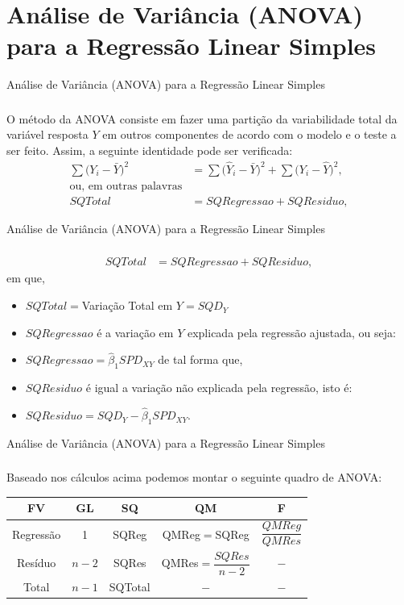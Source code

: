 \documentclass[14pt,aspectratio=1610]{beamer}
\begin{document}
\section{Análise de Variância (ANOVA) para a Regressão Linear Simples}
\begin{frame}{Análise de Variância (ANOVA) para a Regressão Linear Simples}
\frametitle{}
\begin{block}{}
\justifying
O método da ANOVA consiste em fazer uma partição da variabilidade total da variável resposta $Y$ em outros componentes de acordo com o modelo e o teste a ser feito. Assim, a seguinte identidade pode ser verificada:
\begin{align*}
    \sum\big(Y_{i}-\bar{Y}\big)^{2}&=\sum\big(\hat{Y}_{i}-\bar{Y}\big)^{2}+\sum\big(Y_{i}-\hat{Y}\big)^{2},\\
    \textrm{ou, em outras palavras}\\
    SQTotal&=SQRegressao+SQResiduo,
\end{align*}
\end{block}
\end{frame}

\begin{frame}{Análise de Variância (ANOVA) para a Regressão Linear Simples}
\frametitle{}
\begin{block}{}
\justifying
\begin{align*}
    SQTotal&=SQRegressao+SQResiduo,
\end{align*}
em que, 
\begin{itemize}
    \item $SQTotal=$Variação Total em $Y=SQD_{Y}$\pause 
    \item $SQRegressao$ é a variação em $Y$ explicada pela regressão ajustada, ou seja:\pause
    \item $SQRegressao=\hat{\beta}_{1}SPD_{XY}$ de tal forma que,\pause 
    \item $SQResiduo$ é igual a variação não explicada pela regressão, isto é:\pause 
    \item $SQResiduo=SQD_{Y}-\hat{\beta}_{1}SPD_{XY}.$
\end{itemize}
\end{block}
\end{frame}

\begin{frame}{Análise de Variância (ANOVA) para a Regressão Linear Simples}
\frametitle{}
\begin{block}{}
Baseado nos cálculos acima podemos montar o seguinte quadro de ANOVA:
\begin{table}[h]
    \centering
    \begin{tabular}{ccccc}
    \hline
         FV&GL&SQ&QM&F\\
         \hline
         Regressão&1&SQReg&QMReg$=$SQReg&$\dfrac{QMReg}{QMRes}$\\
         Resíduo&$n-2$&SQRes&QMRes$=\dfrac{SQRes}{n-2}$&$-$\\
         \hline
         Total&$n-1$&SQTotal&$-$&$-$\\
         \hline
    \end{tabular}
\end{table}
\end{block}
\end{frame}
\end{document}

